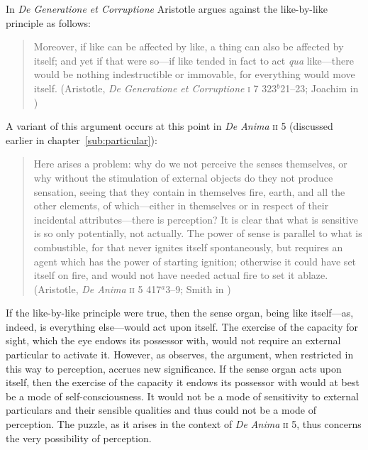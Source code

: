In \emph{De Generatione et Corruptione} Aristotle argues against the like-by-like principle as follows:
\begin{quote}
	Moreover, if like can be affected by like, a thing can also be affected by itself; and yet if that were so---if like tended in fact to act \emph{qua} like---there would be nothing indestructible or immovable, for everything would move itself. (Aristotle, \emph{De Generatione et Corruptione} \textsc{i} 7 323\( ^{b} \)21--23; Joachim in \citealt[23]{Barnes:1984uq})
\end{quote}
A variant of this argument occurs at this point in \emph{De Anima} \textsc{ii} 5 (discussed earlier in chapter~\ref{sub:particular}): 
\begin{quote}
	Here arises a problem: why do we not perceive the senses themselves, or why without the stimulation of external objects do they not produce sensation, seeing that they contain in themselves fire, earth, and all the other elements, of which---either in themselves or in respect of their incidental attributes---there is perception? It is clear that what is sensitive is so only potentially, not actually. The power of sense is parallel to what is combustible, for that never ignites itself spontaneously, but requires an agent which has the power of starting ignition; otherwise it could have set itself on fire, and would not have needed actual fire to set it ablaze. (Aristotle, \emph{De Anima} \textsc{ii} 5 417\( ^{a} \)3--9; Smith in \citealt[29]{Barnes:1984uq})
\end{quote}
If the like-by-like principle were true, then the sense organ, being like itself---as, indeed, is everything else---would act upon itself. The exercise of the capacity for sight, which the eye endows its possessor with, would not require an external particular to activate it. However, as \citet[226--227]{Polansky:2007ly} observes, the argument, when restricted in this way to perception, accrues new significance. If the sense organ acts upon itself, then the exercise of the capacity it endows its possessor with would at best be a mode of self-consciousness. It would not be a mode of sensitivity to external particulars and their sensible qualities and thus could not be a mode of perception. The puzzle, as it arises in the context of \emph{De Anima} \textsc{ii} 5, thus concerns the very possibility of perception.

